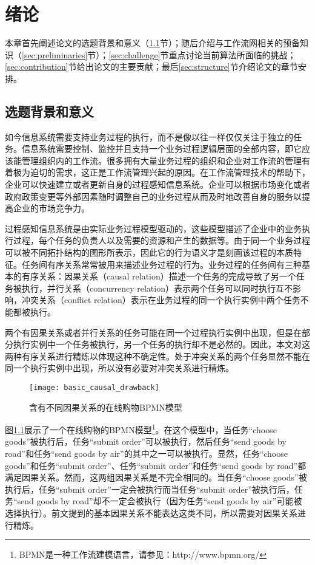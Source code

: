 
\chapter{绪论}\label{cha:intro}
本章首先阐述论文的选题背景和意义（\ref{sec:background}节）；随后介绍与工作流网相关的预备知识（\ref{sec:preliminaries}节）；\ref{sec:challenge}节重点讨论当前算法所面临的挑战；\ref{sec:contribution}节给出论文的主要贡献；最后\ref{sec:structure}节介绍论文的章节安排。

\section{选题背景和意义}\label{sec:background}
如今信息系统需要支持业务过程的执行，而不是像以往一样仅仅关注于独立的任务。信息系统需要控制、监控并且支持一个业务过程逻辑层面的全部内容，即它应该能管理组织内的工作流。很多拥有大量业务过程的组织和企业对工作流的管理有着极为迫切的需求，这正是工作流管理兴起的原因\cite{van1998application}。在工作流管理技术的帮助下，企业可以快速建立或者更新自身的过程感知信息系统\cite{dumas2005process}。企业可以根据市场变化或者政府政策变更等外部因素随时调整自己的业务过程从而及时地改善自身的服务以提高企业的市场竞争力。

过程感知信息系统是由实际业务过程模型驱动的，这些模型描述了企业中的业务执行过程，每个任务的负责人以及需要的资源和产生的数据等。由于同一个业务过程可以被不同拓扑结构的图形所表示，因此它的行为语义才是刻画该过程的本质特征。任务间有序关系\cite{esparza2002improvement}常常被用来描述业务过程的行为。业务过程的任务间有三种基本的有序关系：因果关系（causal relation）描述一个任务的完成导致了另一个任务被执行，并行关系（concurrency relation）表示两个任务可以同时执行互不影响，冲突关系（conflict relation）表示在业务过程的同一个执行实例中两个任务不能都被执行。

两个有因果关系或者并行关系的任务可能在同一个过程执行实例中出现，但是在部分执行实例中一个任务被执行，另一个任务的执行却不是必然的。因此，本文对这两种有序关系进行精炼以体现这种不确定性。处于冲突关系的两个任务显然不能在同一个执行实例中出现，所以没有必要对冲突关系进行精炼。

\begin{figure}[htbp]
  \centering
  \texttt{[image: basic\_causal\_drawback]}
  \caption{含有不同因果关系的在线购物BPMN模型\label{fig:basic_causal_drawback}}
\end{figure}

\begin{example}\label{ex:basic_causal_drawback}
图\ref{fig:basic_causal_drawback}展示了一个在线购物的BPMN模型\footnote{BPMN是一种工作流建模语言，请参见：http://www.bpmn.org/}。在这个模型中，当任务“choose goods”被执行后，任务“submit order”可以被执行，然后任务“send goods by road”和任务“send goods by air”的其中之一可以被执行。显然，任务“choose goods”和任务“submit order”、任务“submit order”和任务“send goods by road”都满足因果关系。然而，这两组因果关系是不完全相同的。当任务“choose goods”被执行后，任务“submit order”一定会被执行而当任务“submit order”被执行后，任务“send goods by road”却不一定会被执行（因为任务“send goods by air”可能被选择执行）。前文提到的基本因果关系不能表达这类不同，所以需要对因果关系进行精炼。
\end{example}

